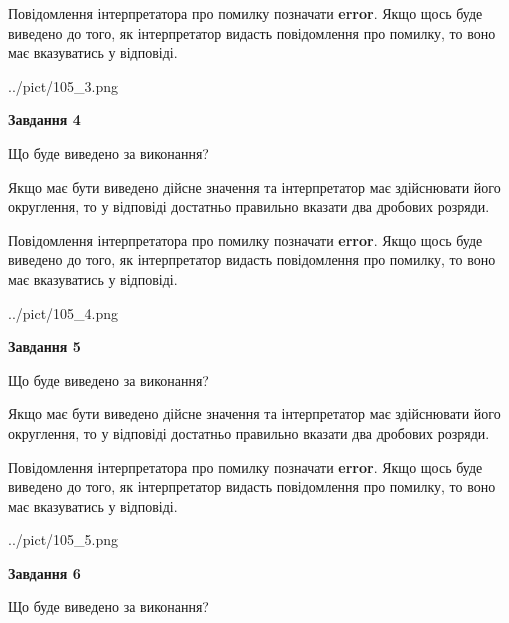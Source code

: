 \documentclass[12pt, ukrainian]{article}
\begin{document}
{\begin {Large}
Повідомлення інтерпретатора про помилку позначати \textbf{error}.
Якщо щось буде виведено до того, як інтерпретатор видасть повідомлення про помилку, 
то воно має вказуватись у відповіді. \par

\begin{center}
	{../pict/105_3.png}
\end{center}
\newpage

{\begin {center}\textbf{Завдання 4}\end {center}}\par
Що буде виведено за виконання? \par

Якщо має бути виведено дійсне значення та інтерпретатор має здійснювати його округлення, 
то у відповіді достатньо правильно вказати два дробових розряди.

Повідомлення інтерпретатора про помилку позначати \textbf{error}.
Якщо щось буде виведено до того, як інтерпретатор видасть повідомлення про помилку, 
то воно має вказуватись у відповіді. \par

\begin{center}
	{../pict/105_4.png}
\end{center}
\newpage

{\begin {center}\textbf{Завдання 5}\end {center}}\par
Що буде виведено за виконання? \par

Якщо має бути виведено дійсне значення та інтерпретатор має здійснювати його округлення, 
то у відповіді достатньо правильно вказати два дробових розряди.

Повідомлення інтерпретатора про помилку позначати \textbf{error}.
Якщо щось буде виведено до того, як інтерпретатор видасть повідомлення про помилку, 
то воно має вказуватись у відповіді. \par

\begin{center}
	{../pict/105_5.png}
\end{center}
\newpage

{\begin {center}\textbf{Завдання 6}\end {center}}\par
Що буде виведено за виконання? \par


\end{Large}}
\end{document}
